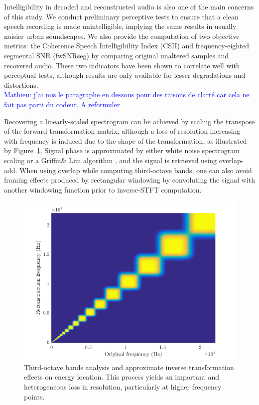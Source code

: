 \documentclass[final,3p,times,twocolumn]{elsarticle}
\newcommand{\ml}[1]{\textcolor{blue}{ Mathieu: #1}}
\begin{document}
Intelligibility in decoded and reconstructed audio is also one of the main concerns of this study. We conduct preliminary perceptive tests to ensure that a clean speech recording is made unintelligible, implying the same results in usually noisier urban soundscapes. We also provide the computation of two objective metrics: the Coherence Speech Intelligibility Index\cite{kates2005} (CSII) and frequency-eighted segmental SNR\cite{hu2008} (fwSNRseg) by comparing original unaltered samples and recovered audio. These two indicators have been shown to correlate well with perceptual tests\cite{ma2009}, although results are only available for lesser degradations and distortions.\\

	\ml{j'ai mis le paragraphe en dessous pour des raisons de clarté car cela ne fait pas parti du codeur. A reformuler}

 Recovering a linearly-scaled spectrogram can be achieved by scaling the transpose of the forward transformation matrix, although a loss of resolution increasing with frequency is induced due to the shape of the transformation, as illustrated by Figure~\ref{fig:freq}. Signal phase is approximated by either white noise spectrogram scaling or a Griffin\& Lim algorithm \cite{griffin1984}, and the signal is retrieved using overlap-add. When using overlap while computing third-octave bands, one can also avoid framing effects produced by rectangular windowing by convoluting the signal with another windowing function prior to inverse-STFT computation.\\

\begin{figure}[htbp]
	\centering
		\includegraphics[width=\columnwidth]{freq.png}
	\caption{Third-octave bands analysis and approximate inverse transformation effects on energy location. This process yields an important and heterogeneous loss in resolution, particularly at higher frequency points.}
	\label{fig:freq}
\end{figure}
\end{document}
